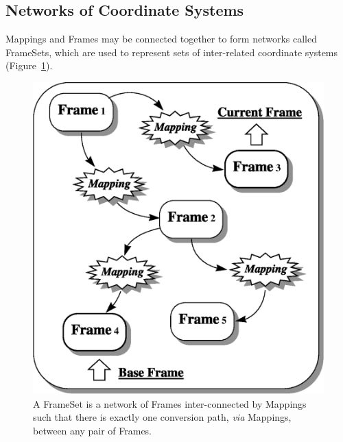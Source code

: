 \documentclass[twoside,11pt]{article}
\newenvironment{latexonly}{}{}
\newcommand{\htmlref}[2]{#1}
\begin{document}
\subsection{Networks of Coordinate Systems}

\begin{latexonly}
   Mappings and Frames may be connected together to form networks called
   FrameSets, which are used to represent sets of inter-related
   coordinate systems (Figure~\ref{fig:frameset}).
   \begin{figure}
   \begin{center}
   \includegraphics[scale=0.75]{sun210_figures/frameset.eps}
   \caption{A \htmlref{FrameSet}{FrameSet} is a network of Frames inter-connected by Mappings
   such that there is exactly one conversion path, {\em{via}} Mappings,
   between any pair of Frames.}
   \label{fig:frameset}
   \end{center}
   \end{figure}
\end{latexonly}
\end{document}
